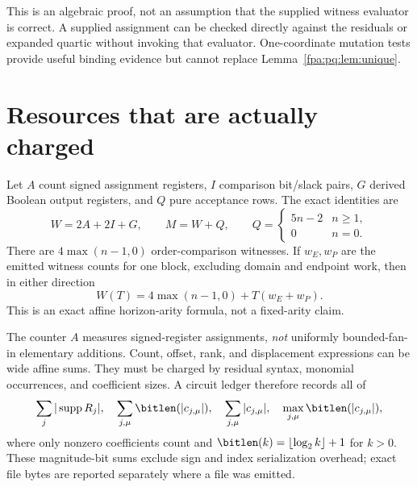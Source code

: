 \documentclass[11pt,a4paper]{article}
\numberwithin{equation}{section}
\newcommand{\supp}{\operatorname{supp}}\newcommand{\Swap}{\operatorname{Swap}}
\begin{document}
This is an algebraic proof, not an assumption that the supplied witness evaluator is correct. A supplied assignment can be checked directly against the residuals or expanded quartic without invoking that evaluator. One-coordinate mutation tests provide useful binding evidence but cannot replace Lemma~\ref{fpa:pq:lem:unique}.

\section{Resources that are actually charged}\label{fpa:pq:sec:cost}
Let $A$ count signed assignment registers, $I$ comparison bit/slack pairs, $G$ derived Boolean output registers, and $Q$ pure acceptance rows. The exact identities are
\begin{equation}\label{fpa:pq:eq:counts}
W=2A+2I+G,\qquad M=W+Q,
\qquad Q=\begin{cases}5n-2&n\ge1,\\0&n=0.\end{cases}
\end{equation}
There are $4\max(n-1,0)$ order-comparison witnesses. If $w_E,w_P$ are the emitted witness counts for one block, excluding domain and endpoint work, then in either direction
\begin{equation}\label{fpa:pq:eq:timearity}
W(T)=4\max(n-1,0)+T(w_E+w_P).
\end{equation}
This is an exact affine horizon-arity formula, not a fixed-arity claim.

The counter $A$ measures signed-register assignments, \emph{not} uniformly bounded-fan-in elementary additions. Count, offset, rank, and displacement expressions can be wide affine sums. They must be charged by residual syntax, monomial occurrences, and coefficient sizes. A circuit ledger therefore records all of
\[
\sum_j|\supp R_j|,\quad
\sum_{j,\mu}\bitlen(|c_{j,\mu}|),\quad
\sum_{j,\mu}|c_{j,\mu}|,\quad
\max_{j,\mu}\bitlen(|c_{j,\mu}|),
\]
where only nonzero coefficients count and $\bitlen(k)=\lfloor\log_2 k\rfloor+1$ for $k>0$. These magnitude-bit sums exclude sign and index serialization overhead; exact file bytes are reported separately where a file was emitted.
\end{document}
